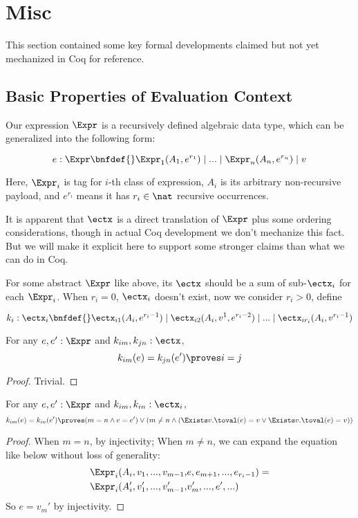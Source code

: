 \section{Misc}
\label{sec:misc}

This section contained some key formal developments claimed but not yet mechanized in Coq for reference.

\subsection{Basic Properties of Evaluation Context}

Our expression $\Expr$ is a recursively defined algebraic data type, which can be generalized into the following form:

\[
e : \Expr \bnfdef{} \Expr_1(A_1, e^{r_1}) \mid ... \mid \Expr_n(A_n, e^{r_n}) \mid v
\]

Here, $\Expr_i$ is tag for $i$-th class of expression, $A_i$ is its arbitrary non-recursive payload, and $e^{r_i}$ means
it has $r_i \in \nat$ recursive occurrences.

It is apparent that $\ectx$ is a direct translation of $\Expr$ plus some ordering considerations, though in actual Coq development we don't mechanize this fact.
But we will make it explicit here to support some stronger claims than what we can do in Coq.

For some abstract $\Expr$ like above, its $\ectx$ should be a sum of sub-$\ectx_i$ for each $\Expr_i$. When $r_i = 0$, $\ectx_i$ doesn't exist, now we consider
$r_i > 0$, define

\[
k_i: \ectx_i \bnfdef{} \ectx_{i1}(A_i, e^{r_i - 1}) \mid \ectx_{i2}(A_i, v^1, e^{r_i - 2}) \mid ... \mid \ectx_{ir_i}(A_i, v^{r_i - 1})
\]

\begin{theorem}
For any $e, e': \Expr$ and $k_{im}, k_{jn}: \ectx$,
\[k_{im}(e) = k_{jn}(e') \proves i = j \]
\end{theorem}
\begin{proof} Trivial. \end{proof}

\begin{theorem}
For any $e, e': \Expr$ and $k_{im}, k_{in}: \ectx_i$,
\[k_{im}(e) = k_{in}(e') \proves
 (m = n \land e = e') \lor
 (m \neq n \land (\Exists v. \toval(e) = v \lor \Exists v. \toval(e) = v))\]
\end{theorem}
\begin{proof} 

When $m = n$, by injectivity;
When $m \neq n$, we can expand the equation like below without loss of generality:
\begin{align*}
\Expr_i(A_i, v_1, ..., v_{m - 1}, &e, e_{m + 1}, ..., e_{r_i - 1}) = \\
\Expr_i(A_i', v_1', ..., v_{m - 1}', &v_m', ..., e', ...)
\end{align*}
So $e = v_m'$ by injectivity.
\end{proof}

